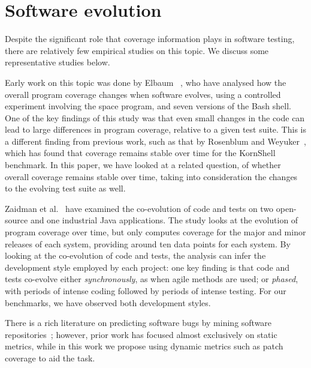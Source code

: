 \section{Software evolution}
\label{related:evolution}

Despite the significant role that coverage information plays in
software testing, there are relatively few empirical studies on this
topic.  We discuss some representative studies below.

Early work on this topic was done by Elbaum \etal~\cite{cov-evol:icsm01}, who
have analysed how the overall program coverage changes when software evolves,
using a controlled experiment involving the \textsf{space} program, and seven
versions of the Bash shell.  One of the key findings of this study was that
even small changes in the code can lead to large differences in program
coverage, relative to a given test suite.  This is a different finding from
previous work, such as that by Rosenblum and Weyuker~\cite{cov_regr97}, which
has found that coverage remains stable over time for the KornShell benchmark.
In this paper, we have looked at a related question, of whether overall
coverage remains stable over time, taking into consideration the changes to the
evolving test suite as well.

Zaidman et al.~\cite{coevol:emse11} have examined the co-evolution of
code and tests on two open-source and one industrial Java
applications.  The study looks at the evolution of program coverage
over time, but only computes coverage for the major and minor releases
of each system, providing around ten data points for each system.  By
looking at the co-evolution of code and tests, the analysis can infer
the development style employed by each project: one key finding is
that code and tests co-evolve either \textit{synchronously}, as when
agile methods are used; or \textit{phased}, with periods of intense
coding followed by periods of intense testing.  For our
benchmarks, we have observed both development styles.

There is a rich literature on predicting software bugs by mining
software repositories~\cite{bug-feature:icse13,genealogies:issre13};
however, prior work has focused almost exclusively on static metrics,
while in this work we propose using dynamic metrics such as patch
coverage to aid the task.


